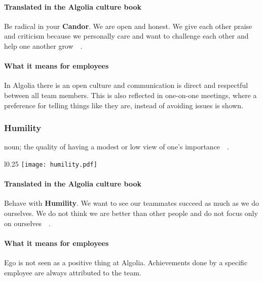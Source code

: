 \paragraph{Translated in the Algolia culture book}

Be radical in your \textbf{Candor}. We are open and honest. We give each other praise and criticism because we personally care and want to challenge each other and help one another grow~\cite{algolia-careers}~.

\paragraph{What it means for employees} 

In Algolia there is an open culture and communication is direct and respectful between all team members. This is also reflected in one-on-one meetings, where a preference for telling things like they are, instead of avoiding issues is shown.

\subsubsection{Humility}
\label{ssub:humility}

\begin{definition}
noun; the quality of having a modest or low view of one's importance~\cite{oxford-humility}~.
\end{definition}

\begin{wrapfigure}{l}{0.25\textwidth}
  \centering
  \texttt{[image: humility.pdf]}
\end{wrapfigure}

\paragraph{Translated in the Algolia culture book}

Behave with \textbf{Humility}. We want to see our teammates succeed as much as we do ourselves. We do not think we are better than other people and do not focus only on ourselves~\cite{algolia-careers}~.

\paragraph{What it means for employees} 

Ego is not seen as a positive thing at Algolia. Achievements done by a specific employee are always attributed to the team.

